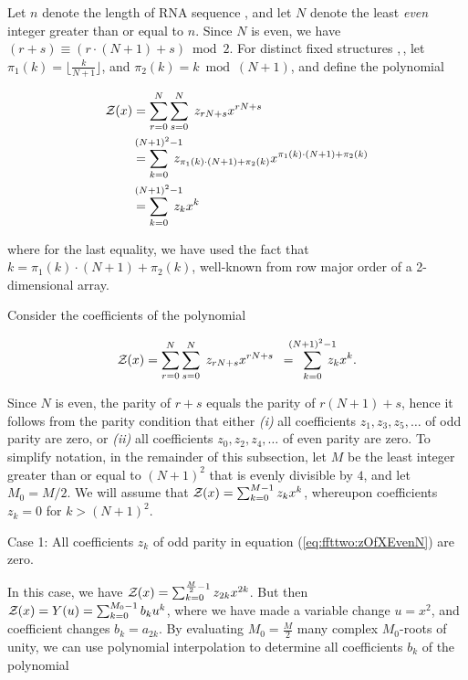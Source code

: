 Let $n$ denote the length of RNA sequence \seq, and let $N$ denote the
least {\em even} integer greater than or equal to $n$. Since $N$ is even,
we have $(r+s) \equiv (r\cdot(N+1)+s) \bmod 2$. For distinct
fixed structures \strA,\,\strB, let
$\pi_1(k) = \lfloor \frac{k}{N+1} \rfloor$, and
$\pi_2(k) = k \bmod (N+1)$, and define the polynomial

\begin{align}
\label{eq:ffttwo:polyRecEvenN}
\begin{split}
\emZ{} &= \sum_{r=0}^{N} \sum_{s=0}^{N}\; z_{rN+s} x^{rN+s} \\
&=
\sum_{k=0}^{\mathclap{(N+1)^2-1}}\; z_{\pi_1(k)\cdot (N+1) + \pi_2(k)}
x^{\pi_1(k)\cdot (N+1) + \pi_2(k)} \\
&=
\sum_{k=0}^{\mathclap{(N+1)^2-1}}\; z_k x^k
\end{split}
\end{align}

where for the last equality, we have used the fact that
$k = \pi_1(k)\cdot (N+1)+\pi_2(k)$, well-known from
row major order of a 2-dimensional array.

Consider the coefficients of the polynomial

\begin{align}
\label{eq:ffttwo:zOfXEvenN}
\emZ{} = \sum_{r=0}^{N} \sum_{s=0}^{N}\; z_{rN+s} x^{rN+s}
\enspace=\enspace\sum_{k=0}^{\mathclap{(N+1)^2-1}}\; z_k x^k.
\end{align}

Since $N$ is even, the parity of $r+s$ equals the parity of
$r(N+1)+s$, hence  it follows from the parity condition that either
{\em (i)} all coefficients $z_1,z_3,z_5,\dots$ of odd parity are zero,
or {\em (ii)} all coefficients $z_0,z_2,z_4,\dots$ of even parity are zero.
To simplify notation, in the remainder of this subsection, let $M$ be
the least integer greater than or equal to $(N+1)^2$ that is evenly divisible
by $4$, and let $M_0=M/2$. We will assume that ${\mathcal Z}_{}(x) = \sum_{k=0}^{M-1}
z_k x^k$, whereupon coefficients $z_k=0$ for $k>(N+1)^2$.

\medskip
{\sc Case 1}: All coefficients $z_k$ of odd parity in
equation (\ref{eq:ffttwo:zOfXEvenN}) are zero.
\smallskip

\noindent
In this case, we have
${\mathcal Z}_{}(x) = \sum_{k=0}^{\frac{M}{2}-1} z_{2k} x^{2k}$. But then
${\mathcal Z}_{}(x) = Y(u) = \sum_{k=0}^{M_0-1} b_k u^k$,
where we have made a variable change $u=x^2$, and coefficient changes
$b_k = a_{2k}$.
By evaluating $M_0=\frac{M}{2}$ many complex
$M_0$-roots of unity, we can
use polynomial interpolation to determine all coefficients $b_k$ of
the polynomial

